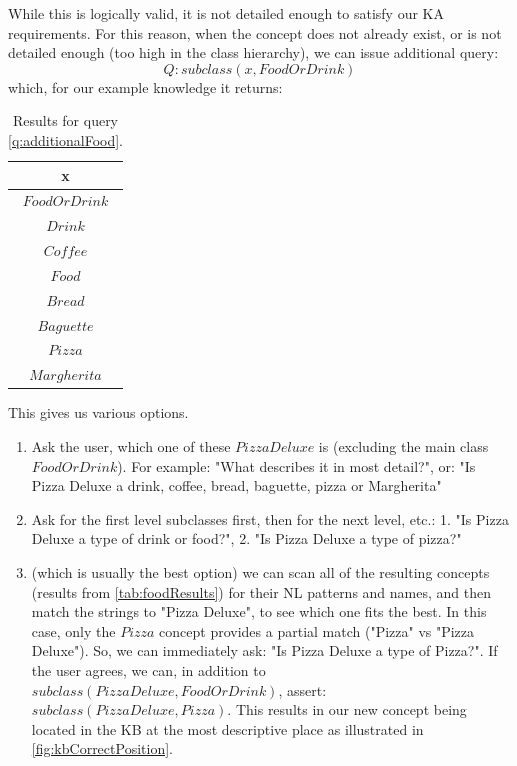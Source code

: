 While this is logically valid, it is not detailed enough to satisfy our KA 
requirements. For this reason, when the concept does not already exist, or is 
not detailed enough (too high in the class hierarchy), we can issue additional 
query:
\begin{equation}\label{q:additionalFood}
Q:subclass(x,FoodOrDrink)
\end{equation}
which, for our example knowledge it returns:
\begin{table}[H]
\centering
\caption{Results for query \ref{q:additionalFood}.}
\label{tab:foodResults}
\begin{tabular}{|c|}
	\hline
	\textbf{x} \\
    \hline
    $FoodOrDrink$ \\
    \hline
    $Drink$ \\
    \hline
    $Coffee$ \\
    \hline
    $Food$ \\
    \hline
    $Bread$ \\
    \hline
    $Baguette$ \\
    \hline
    $Pizza$ \\
    \hline
    $Margherita$ \\
    \hline
\end{tabular}
\end{table}
This gives us various options.
\begin{enumerate}
\item Ask the user, which one of these $PizzaDeluxe$ is (excluding the main 
class $FoodOrDrink$). For example: "What describes it in most detail?", or: 
"Is Pizza Deluxe a drink, coffee, bread, baguette, pizza or Margherita"
\item Ask for the first level subclasses first, then for the next level, 
etc.: 1. "Is Pizza Deluxe a type of drink or food?", 2. "Is Pizza Deluxe a 
type of pizza?"
\item (which is usually the best option) we can scan all of the resulting 
concepts (results from \autoref{tab:foodResults}) for their NL patterns and 
names, and then match the strings to "Pizza Deluxe", to see which one fits the 
best. In this case, only the $Pizza$ concept provides a partial match ("Pizza"
vs "Pizza Deluxe"). So, we can immediately ask: "Is Pizza Deluxe a type of 
Pizza?". If the user agrees, we can, in addition to 
$subclass(PizzaDeluxe,FoodOrDrink)$, assert: $subclass(PizzaDeluxe,Pizza)$. 
This results in our new concept being located in the KB at the most descriptive
place as illustrated in \autoref{fig:kbCorrectPosition}.
\end{enumerate}


